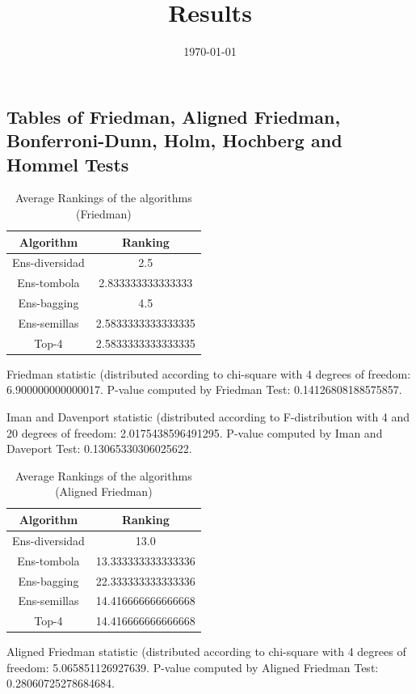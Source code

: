\documentclass[a4paper,10pt]{article}
\title{Results}
\author{}
\date{\today}
\begin{document}
\begin{landscape}
\oddsidemargin 0in \topmargin 0in\maketitle
\section{Tables of Friedman, Aligned Friedman, Bonferroni-Dunn, Holm, Hochberg and Hommel Tests}
\begin{table}[!htp]
\centering
\caption{Average Rankings of the algorithms (Friedman)
}\begin{tabular}{c|c}
Algorithm&Ranking\\
\hline
Ens-diversidad&2.5\\
Ens-tombola&2.833333333333333\\
Ens-bagging&4.5\\
Ens-semillas&2.5833333333333335\\
Top-4&2.5833333333333335\\
\end{tabular}
\end{table}


Friedman statistic (distributed according to chi-square with 4 degrees of freedom: 6.900000000000017. 
P-value computed by Friedman Test: 0.14126808188575857.\newline

Iman and Davenport statistic (distributed according to F-distribution with 4 and 20 degrees of freedom: 2.0175438596491295. 
P-value computed by Iman and Daveport Test: 0.13065330306025622.\newline


\newpage

\begin{table}[!htp]
\centering
\caption{Average Rankings of the algorithms (Aligned Friedman)
}\begin{tabular}{c|c}
Algorithm&Ranking\\
\hline
Ens-diversidad&13.0\\
Ens-tombola&13.333333333333336\\
Ens-bagging&22.333333333333336\\
Ens-semillas&14.416666666666668\\
Top-4&14.416666666666668\\
\end{tabular}
\end{table}


Aligned Friedman statistic (distributed according to chi-square with 4 degrees of freedom: 5.065851126927639. 
P-value computed by Aligned Friedman Test: 0.28060725278684684.\newline



\end{landscape}
\end{document}
